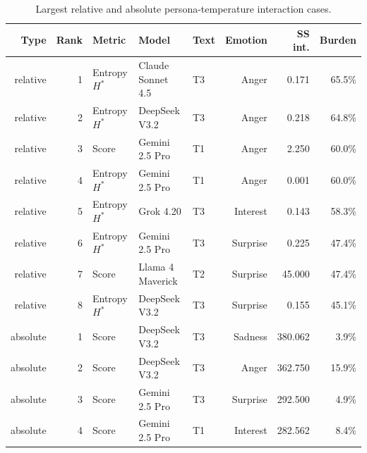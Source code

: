 \begin{table}[t]
\centering
\caption{Largest relative and absolute persona-temperature interaction cases.}
\label{tab:scis-top-interactions}
\begin{tabular}{rrlllrrr}
\hline
Type & Rank & Metric & Model & Text & Emotion & SS int. & Burden \\
\hline
relative & 1 & Entropy $H^*$ & Claude Sonnet 4.5 & T3 & Anger & 0.171 & 65.5\% \\
relative & 2 & Entropy $H^*$ & DeepSeek V3.2 & T3 & Anger & 0.218 & 64.8\% \\
relative & 3 & Score & Gemini 2.5 Pro & T1 & Anger & 2.250 & 60.0\% \\
relative & 4 & Entropy $H^*$ & Gemini 2.5 Pro & T1 & Anger & 0.001 & 60.0\% \\
relative & 5 & Entropy $H^*$ & Grok 4.20 & T3 & Interest & 0.143 & 58.3\% \\
relative & 6 & Entropy $H^*$ & Gemini 2.5 Pro & T3 & Surprise & 0.225 & 47.4\% \\
relative & 7 & Score & Llama 4 Maverick & T2 & Surprise & 45.000 & 47.4\% \\
relative & 8 & Entropy $H^*$ & DeepSeek V3.2 & T3 & Surprise & 0.155 & 45.1\% \\
absolute & 1 & Score & DeepSeek V3.2 & T3 & Sadness & 380.062 & 3.9\% \\
absolute & 2 & Score & DeepSeek V3.2 & T3 & Anger & 362.750 & 15.9\% \\
absolute & 3 & Score & Gemini 2.5 Pro & T3 & Surprise & 292.500 & 4.9\% \\
absolute & 4 & Score & Gemini 2.5 Pro & T1 & Interest & 282.562 & 8.4\% \\
\hline
\end{tabular}
\end{table}

